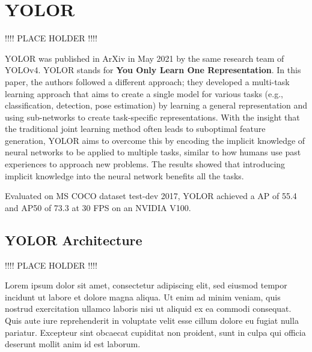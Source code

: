 \documentclass{article}
\begin{document}


\section{YOLOR}

!!!! PLACE HOLDER !!!!


YOLOR \cite{wang2021you} was published in ArXiv in May 2021 by the same research team of YOLOv4. YOLOR stands for \textbf{You Only Learn One Representation}. In this paper, the authors followed a different approach; they developed a multi-task learning approach that aims to create a single model for various tasks (e.g., classification, detection, pose estimation) by learning a general representation and using sub-networks to create task-specific representations. With the insight that the traditional joint learning method often leads to suboptimal feature generation, YOLOR aims to overcome this by encoding the implicit knowledge of neural networks to be applied to multiple tasks, similar to how humans use past experiences to approach new problems. The results showed that introducing implicit knowledge into the neural network benefits all the tasks.

Evaluated on MS COCO dataset test-dev 2017, YOLOR achieved a AP of 55.4 and AP50 of 73.3 at 30 FPS on an NVIDIA V100.

\subsection{YOLOR Architecture}

!!!! PLACE HOLDER !!!!

Lorem ipsum dolor sit amet, consectetur adipiscing elit, sed eiusmod tempor incidunt ut labore et dolore magna aliqua. Ut enim ad minim veniam, quis nostrud exercitation ullamco laboris nisi ut aliquid ex ea commodi consequat. Quis aute iure reprehenderit in voluptate velit esse cillum dolore eu fugiat nulla pariatur. Excepteur sint obcaecat cupiditat non proident, sunt in culpa qui officia deserunt mollit anim id est laborum.
\end{document}
